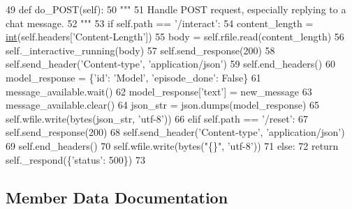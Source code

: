 \begin{DoxyCode}
49     \textcolor{keyword}{def }do\_POST(self):
50         \textcolor{stringliteral}{"""}
51 \textcolor{stringliteral}{        Handle POST request, especially replying to a chat message.}
52 \textcolor{stringliteral}{        """}
53         \textcolor{keywordflow}{if} self.path == \textcolor{stringliteral}{'/interact'}:
54             content\_length = \hyperlink{namespacelanguage__model_1_1eval__ppl_a7d12ee00479673c5c8d1f6d01faa272a}{int}(self.headers[\textcolor{stringliteral}{'Content-Length'}])
55             body = self.rfile.read(content\_length)
56             self.\_interactive\_running(body)
57             self.send\_response(200)
58             self.send\_header(\textcolor{stringliteral}{'Content-type'}, \textcolor{stringliteral}{'application/json'})
59             self.end\_headers()
60             model\_response = \{\textcolor{stringliteral}{'id'}: \textcolor{stringliteral}{'Model'}, \textcolor{stringliteral}{'episode\_done'}: \textcolor{keyword}{False}\}
61             message\_available.wait()
62             model\_response[\textcolor{stringliteral}{'text'}] = new\_message
63             message\_available.clear()
64             json\_str = json.dumps(model\_response)
65             self.wfile.write(bytes(json\_str, \textcolor{stringliteral}{'utf-8'}))
66         \textcolor{keywordflow}{elif} self.path == \textcolor{stringliteral}{'/reset'}:
67             self.send\_response(200)
68             self.send\_header(\textcolor{stringliteral}{'Content-type'}, \textcolor{stringliteral}{'application/json'})
69             self.end\_headers()
70             self.wfile.write(bytes(\textcolor{stringliteral}{"\{\}"}, \textcolor{stringliteral}{'utf-8'}))
71         \textcolor{keywordflow}{else}:
72             \textcolor{keywordflow}{return} self.\_respond(\{\textcolor{stringliteral}{'status'}: 500\})
73 
\end{DoxyCode}


\subsection{Member Data Documentation}
\mbox{\label{classparlai_1_1chat__service_1_1services_1_1browser__chat_1_1client_1_1BrowserHandler_a0422e5814dadd67804c8da0d83794375}} 
